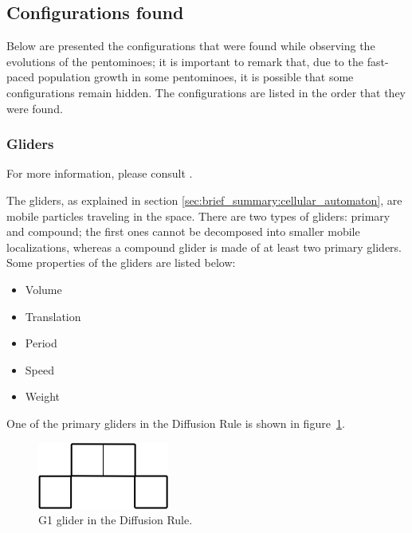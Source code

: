 
\newpage
\subsection{Configurations found}
\label{sec:configurations-found}
Below are presented the configurations that were found while observing the
evolutions of the pentominoes; it is important to remark that, due to the
fast-paced population growth in some pentominoes, it is possible that some
configurations remain hidden. The configurations are listed in the order that
they were found.

\subsubsection{Gliders}

For more information, please consult \cite{j2}.

The gliders, as explained in section \ref{sec:brief_summary:cellular_automaton},
are mobile particles traveling in the space. There are two types of gliders:
primary and compound; the first ones cannot be decomposed into smaller mobile
localizations, whereas a compound glider is made of at least two primary
gliders. Some properties of the gliders are listed below:
\begin{itemize}
  \item Volume
  \item Translation
  \item Period
  \item Speed
  \item Weight
\end{itemize}

One of the primary gliders in the Diffusion Rule is shown in
figure~\ref{fig:dr-glider-1}.

\begin{figure}
	\centering
	\includegraphics[scale=0.5]{df_settings_dd/dr-glider-1.png}
	\caption{G1 glider in the Diffusion Rule.}
  \label{fig:dr-glider-1}
\end{figure}

